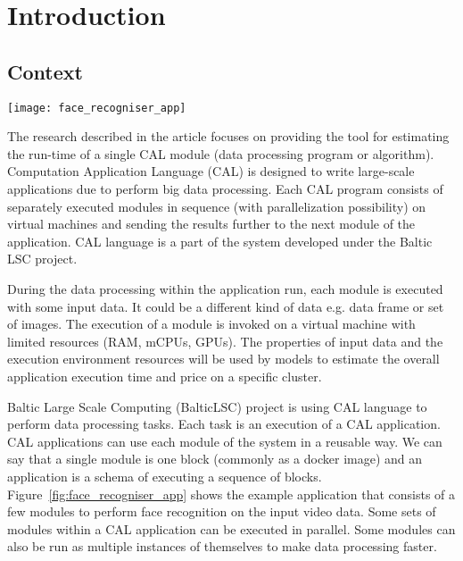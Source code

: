 \section{Introduction}
\subsection{Context}

\begin{figure*}[!t]
	\centering
	\begin{minipage}{0.9\linewidth}
		\texttt{[image: face\_recogniser\_app]}
	\end{minipage}
	\caption{\textit{Face Recogniser} scheme. Application written in the CAL language.}
	\label{fig:face_recogniser_app}
\end{figure*}

The research described in the article focuses on providing the tool for estimating the run-time of a single CAL module (data processing program or algorithm). Computation Application Language (CAL) is designed to write large-scale applications due to perform big data processing. Each CAL program consists of separately executed modules in sequence (with parallelization possibility) on virtual machines and sending the results further to the next module of the application. CAL language is a part of the system developed under the Baltic LSC\cite{baltic_lsc_website} project.

During the data processing within the application run, each module is executed with some input data. It could be a different kind of data e.g. data frame or set of images. The execution of a module is invoked on a virtual machine with limited resources (RAM, mCPUs, GPUs). The properties of input data and the execution environment resources will be used by models to estimate the overall application execution time and price on a specific cluster.

Baltic Large Scale Computing (BalticLSC\cite{baltic_lsc}) project is using CAL language to perform data processing tasks. Each task is an execution of a CAL application. CAL applications can use each module of the system in a reusable way. We can say that a single module is one block (commonly as a docker image) and an application is a schema of executing a sequence of blocks. Figure~\ref{fig:face_recogniser_app} shows the example application that consists of a few modules to perform face recognition on the input video data. Some sets of modules within a CAL application can be executed in parallel. Some modules can also be run as multiple instances of themselves to make data processing faster.

